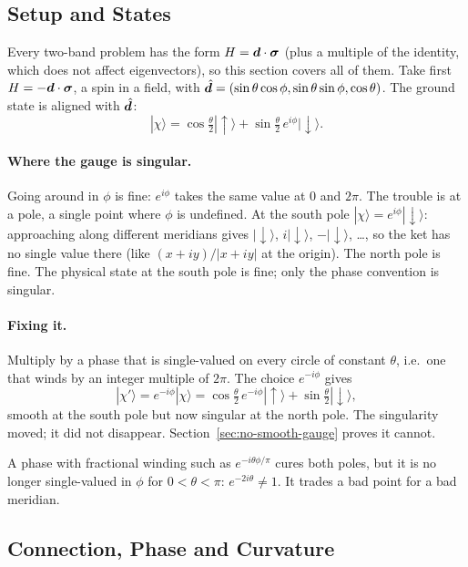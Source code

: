 \subsection{Setup and States}

Every two-band problem has the form $H = \bm{d}\cdot\bm{\sigma}$ (plus a multiple of the identity, which does not affect eigenvectors), so this section covers all of them. Take first $H = -\bm{d}\cdot\bm{\sigma}$, a spin in a field, with $\hat{\bm{d}} = (\sin\theta\cos\phi,\sin\theta\sin\phi,\cos\theta)$. The ground state is aligned with $\hat{\bm{d}}$:
\[
    |\chi\rangle = \cos\tfrac\theta2|{\uparrow}\rangle + \sin\tfrac\theta2\,e^{i\phi}|{\downarrow}\rangle .
\]

\paragraph{Where the gauge is singular.} Going around in $\phi$ is fine: $e^{i\phi}$ takes the same value at $0$ and $2\pi$. The trouble is at a pole, a single point where $\phi$ is undefined. At the south pole $|\chi\rangle = e^{i\phi}|{\downarrow}\rangle$: approaching along different meridians gives $|{\downarrow}\rangle$, $i|{\downarrow}\rangle$, $-|{\downarrow}\rangle$, \dots, so the ket has no single value there (like $(x+iy)/|x+iy|$ at the origin). The north pole is fine. The physical state at the south pole is fine; only the phase convention is singular.

\paragraph{Fixing it.} Multiply by a phase that is single-valued on every circle of constant $\theta$, i.e.\ one that winds by an integer multiple of $2\pi$. The choice $e^{-i\phi}$ gives
\[
    |\chi'\rangle = e^{-i\phi}|\chi\rangle = \cos\tfrac\theta2\,e^{-i\phi}|{\uparrow}\rangle + \sin\tfrac\theta2|{\downarrow}\rangle,
\]
smooth at the south pole but now singular at the north pole. The singularity moved; it did not disappear. Section~\ref{sec:no-smooth-gauge} proves it cannot.

\begin{fact}
A phase with fractional winding such as $e^{-i\theta\phi/\pi}$ cures both poles, but it is no longer single-valued in $\phi$ for $0<\theta<\pi$: $e^{-2i\theta}\neq1$. It trades a bad point for a bad meridian.
\end{fact}

\subsection{Connection, Phase and Curvature}

